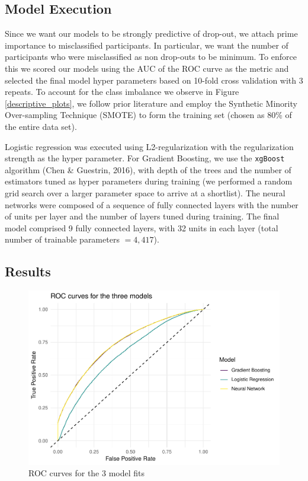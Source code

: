 \documentclass[12pt,]{article}
\begin{document}
\subsection{Model Execution}\label{model-execution}

Since we want our models to be strongly predictive of drop-out, we
attach prime importance to misclassified participants. In particular, we
want the number of participants who were misclassified as non drop-outs
to be minimum. To enforce this we scored our models using the AUC of the
ROC curve as the metric and selected the final model hyper parameters
based on 10-fold cross validation with 3 repeats. To account for the
class imbalance we observe in Figure \ref{descriptive_plots}, we follow
prior literature and employ the Synthetic Minority Over-sampling
Technique (SMOTE) to form the training set (chosen as 80\% of the entire
data set).

Logistic regression was executed using L2-regularization with the
regularization strength as the hyper parameter. For Gradient Boosting,
we use the \texttt{xgBoost} algorithm (Chen \& Guestrin, 2016), with
depth of the trees and the number of estimators tuned as hyper
parameters during training (we performed a random grid search over a
larger parameter space to arrive at a shortlist). The neural networks
were composed of a sequence of fully connected layers with the number of
units per layer and the number of layers tuned during training. The
final model comprised 9 fully connected layers, with 32 units in each
layer (total number of trainable parameters \(=4,417\)).

\subsection{Results}\label{results}

\begin{figure}[p]

{\centering \includegraphics[width=1\linewidth]{initial-draft_files/figure-latex/unnamed-chunk-7-1} 

}

\caption{ROC curves for the 3 model fits \label{roc_curves}}\label{fig:unnamed-chunk-7}
\end{figure}
\end{document}
